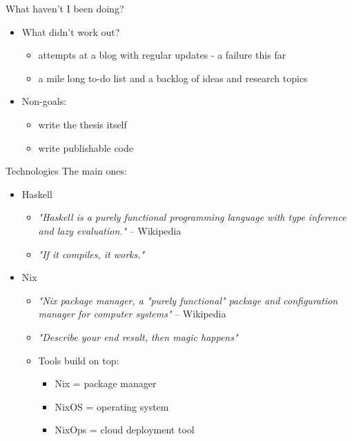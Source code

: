 \documentclass[presentation]{beamer}
\begin{document}
\begin{frame}[label={sec:orge223630}]{What haven't I been doing?}
\pause

\begin{itemize}
\item What didn't work out?
\begin{itemize}
\item attempts at a blog with regular updates - a failure this far
\item a mile long to-do list and a backlog of ideas and research topics
\end{itemize}
\end{itemize}

\pause

\begin{itemize}
\item Non-goals:
\begin{itemize}
\item write the thesis itself
\item write publishable code
\end{itemize}
\end{itemize}
\end{frame}

\begin{frame}[label={sec:org844ef77}]{Technologies}
The main ones:
\begin{itemize}
\item Haskell
\begin{itemize}
\item \emph{"Haskell is a purely functional programming language with type inference and
lazy evaluation."} -- Wikipedia
\item \emph{"If it compiles, it works."}
\end{itemize}
\item Nix
\begin{itemize}
\item \emph{"Nix package manager, a "purely functional" package and configuration
manager for computer systems"} -- Wikipedia
\item \emph{"Describe your end result, then magic happens"} \Smiley
\item Tools build on top:
\begin{itemize}
\item Nix = package manager
\item NixOS = operating system
\item NixOps = cloud deployment tool
\end{itemize}
\end{itemize}
\end{itemize}
\end{frame}
\end{document}
